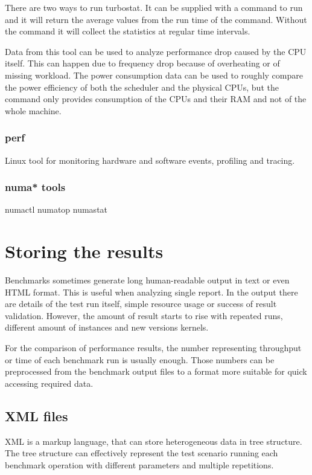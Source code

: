 There are two ways to run turbostat. It can be supplied with a command to run
and it will return the average values from the run time of the command. Without
the command it will collect the statistics at regular time intervals.

Data from this tool can be used to analyze performance drop caused by the CPU
itself. This can happen due to frequency drop because of overheating or of
missing workload. The power consumption data can be used to roughly compare the
power efficiency of both the scheduler and the physical CPUs, but the command
only provides consumption of the CPUs and their RAM and not of the whole
machine.

\subsection{perf}
Linux tool for monitoring hardware and software events, profiling and tracing.

\subsection{numa* tools}
numactl
numatop
numastat



\chapter{Storing the results} \label{ch:storage}
Benchmarks sometimes generate long human-readable output in text or even HTML
format. This is useful when analyzing single report. In the output there are details
of the test run itself, simple resource usage or success of result validation.
However, the amount of result starts to rise with repeated runs, different
amount of instances and new versions kernels.

For the comparison of performance results, the number representing throughput or
time of each benchmark run is usually enough. Those numbers can be preprocessed
from the benchmark output files to a format more suitable for quick accessing
required data.

\section{XML files}
XML is a markup language, that can store heterogeneous data in tree structure.
The tree structure can effectively represent the test scenario running each
benchmark operation with different parameters and multiple repetitions.

